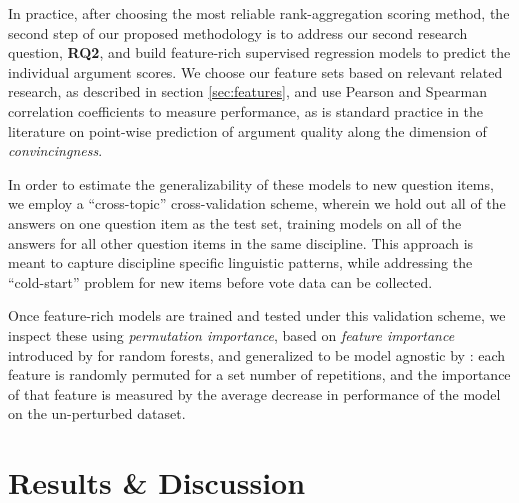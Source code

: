 \documentclass[notitlepage,12pt]{jedm}
\begin{document}
%
%

In practice, after choosing the most reliable rank-aggregation scoring method, 
the second step of our proposed methodology is to address our second research 
question, \textbf{RQ2}, and build feature-rich supervised regression models to 
predict the individual argument scores.
We choose our feature sets based on relevant related research, as described in 
section \ref{sec:features}, and use Pearson and Spearman correlation 
coefficients to measure performance, as is standard practice in the literature 
on point-wise prediction of argument quality along the dimension of 
\textit{convincingness}. 
 
In order to estimate the generalizability of these models to new question 
items, we employ a ``cross-topic'' cross-validation scheme, wherein we hold out 
all of the answers on one question item as the test set, training models on all 
of the answers for all other question items in the same discipline.
This approach is meant to capture discipline specific linguistic patterns, 
while addressing the ``cold-start'' problem for new items before vote data 
can be collected.

Once feature-rich models are trained and tested under this validation scheme, 
we inspect these using \textit{permutation importance}, based on 
\textit{feature importance} introduced by \cite{breiman_random_2001} for random 
forests, and generalized to be model agnostic by \cite{fisher_all_2019}: each 
feature is randomly permuted for a set number of repetitions, and the 
importance of that feature is measured by the average decrease in performance 
of the model on the un-perturbed dataset.



\section{Results \& Discussion}\label{sec:model_results}
\end{document}
